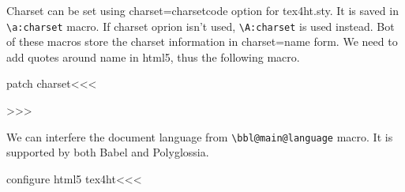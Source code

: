 Charset can be set using charset=charsetcode option for tex4ht.sty. It is saved in \verb|\a:charset| macro. 
If charset oprion isn't used, \verb|\A:charset| is used instead. Bot of these macros store the charset information
in charset=name form. We need to add quotes around name in html5, thus the following macro.

\<patch charset\><<<

\def\:charset:quotes#1=#2.{
  #1="#2"%
}
\def\use:charset{%
  \expandafter\ifx\csname a:charset\endcsname\relax%
    \expandafter\expandafter\expandafter\:charset:quotes\csname A:charset\endcsname.
  \else%
    \expandafter\expandafter\expandafter\:charset:quotes\csname a:charset\endcsname.
  \fi
}
>>>


We can interfere the document language from \verb|\bbl@main@language| macro. It
is supported by both Babel and Polyglossia.

\<configure html5 tex4ht\><<<
\def\Declare:Language#1#2{%
\expandafter\gdef\csname rfclang#1\endcsname{#2}%
}
\def\Get:Language{%
\ifx\bbl@main@language\@undefined en-US%
\else%
\expandafter\ifdefined\csname rfclang\bbl@main@language\endcsname \csname rfclang\bbl@main@language\endcsname\fi%
\fi%
}


